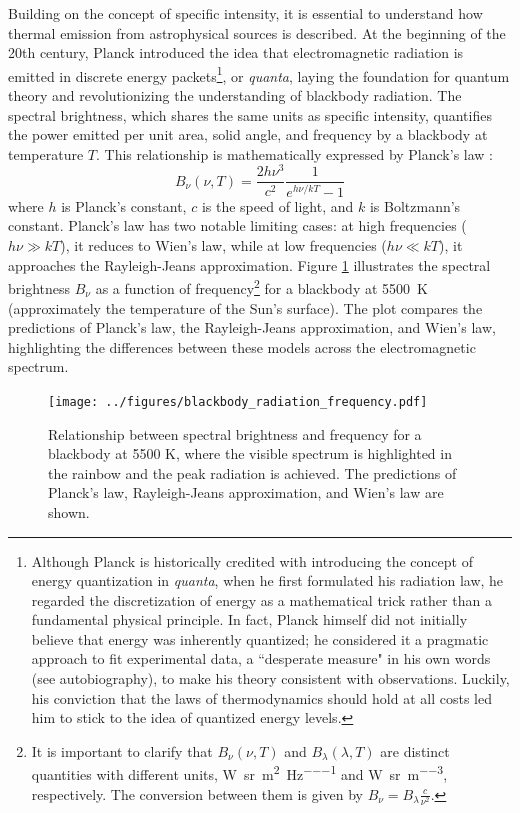Building on the concept of specific intensity, it is essential to understand how thermal emission from astrophysical sources is described. At the beginning of the 20th century, Planck introduced the idea that electromagnetic radiation is emitted in discrete energy packets\footnote{Although Planck is historically credited with introducing the concept of energy quantization in \emph{quanta}, when he first formulated his radiation law, he regarded the discretization of energy as a mathematical trick rather than a fundamental physical principle. In fact, Planck himself did not initially believe that energy was inherently quantized; he considered it a pragmatic approach to fit experimental data, a ``desperate measure" in his own words (see \citealt{Planck1949-PLASAA-3} autobiography), to make his theory consistent with observations. Luckily, his conviction that the laws of thermodynamics should hold at all costs led him to stick to the idea of quantized energy levels.
}, or \emph{quanta}, laying the foundation for quantum theory and revolutionizing the understanding of blackbody radiation. The spectral brightness, which shares the same units as specific intensity, quantifies the power emitted per unit area, solid angle, and frequency by a blackbody at temperature $T$. This relationship is mathematically expressed by Planck's law \citep[see][Chapter~7]{StatisticalMechanics}:
\begin{equation}
	B_\nu(\nu, T) = \frac{2h\nu^3}{c^2} \frac{1}{e^{h\nu/kT}-1}
	\label{eq:planck}
\end{equation}
where $h$ is Planck's constant, $c$ is the speed of light, and $k$ is Boltzmann's constant. Planck's law has two notable limiting cases: at high frequencies ($h\nu \gg kT$), it reduces to Wien's law, while at low frequencies ($h\nu \ll kT$), it approaches the Rayleigh-Jeans approximation. 
Figure \ref{fig:spectral_brightness} illustrates the spectral brightness $B_\nu$ as a function of frequency\footnote{It is important to clarify that $B_\nu(\nu,T)$ and $B_\lambda(\lambda,T)$ are distinct quantities with different units, \si{\watt \per \steradian  \per \meter \squared \per \hertz} and \si{\watt \per \steradian \per \meter \cubed}, respectively. The conversion between them is given by $B_\nu = B_\lambda \frac{c}{\nu^2}$.} 
for a blackbody at 5500~K (approximately the temperature of the Sun's surface). The plot compares the predictions of Planck's law, the Rayleigh-Jeans approximation, and Wien's law, highlighting the differences between these models across the electromagnetic spectrum.
\begin{figure}[h!]
	\centering
	\texttt{[image: ../figures/blackbody\_radiation\_frequency.pdf]}
	\caption[Blackbody radiation example]{Relationship between spectral brightness and frequency for a blackbody at 5500 K, where the visible spectrum is highlighted in the rainbow and the peak radiation is achieved. The predictions of Planck's law, Rayleigh-Jeans approximation, and Wien's law are shown.}
	\label{fig:spectral_brightness}
\end{figure}

